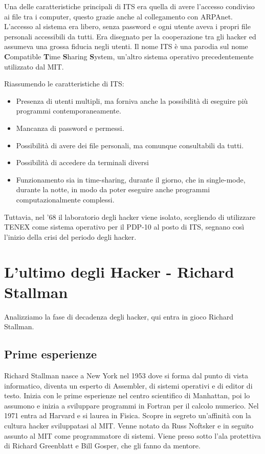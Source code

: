 Una delle caratteristiche principali di ITS era quella di avere l'accesso condiviso ai file tra i computer, questo grazie anche al collegamento con ARPAnet. 
L'accesso al sistema era libero, senza password e ogni utente aveva i propri file personali accessibili da tutti. 
Era disegnato per la cooperazione tra gli hacker ed assumeva una grossa fiducia negli utenti.
Il nome ITS è una parodia sul nome \textbf{C}ompatible \textbf{T}ime \textbf{S}haring \textbf{S}ystem, un'altro sistema operativo precedentemente utilizzato dal MIT.

Riassumendo le caratteristiche di ITS:

\begin{itemize}
	\item Presenza di utenti multipli, ma forniva anche la possibilità di eseguire più programmi contemporaneamente.
	\item Mancanza di password e permessi.
	\item Possibilità di avere dei file personali, ma comunque consultabili da tutti.
	\item Possibilità di accedere da terminali diversi
	\item Funzionamento sia in time-sharing, durante il giorno, che in single-mode, durante la notte, in modo da poter eseguire anche programmi computazionalmente complessi.
\end{itemize}

Tuttavia, nel '68 il laboratorio degli hacker viene isolato, scegliendo di utilizzare TENEX come sistema operativo per il PDP-10 al posto di ITS, segnano così l'inizio della crisi del periodo degli hacker.

\section{L'ultimo degli Hacker - Richard Stallman}

Analizziamo la fase di decadenza degli hacker, qui entra in gioco Richard Stallman.

\subsection{Prime esperienze}

Richard Stallman nasce a New York nel 1953 dove si forma dal punto di vista informatico, diventa un esperto di Assembler, di sistemi operativi e di editor di testo. Inizia con le prime esperienze nel centro scientifico di Manhattan, poi lo assumono e inizia a sviluppare programmi in Fortran per il calcolo numerico. Nel 1971 entra ad Harvard e si laurea in Fisica. Scopre in segreto un'affinità con la cultura hacker sviluppatasi al MIT. Venne notato da Russ Noftsker e in seguito assunto al MIT come programmatore di sistemi. Viene preso sotto l'ala protettiva di Richard Greenblatt e Bill Gosper, che gli fanno da mentore.

